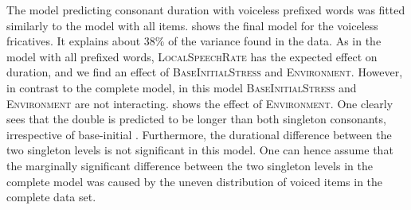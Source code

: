  
\begin{table}[b]
	\caption{Summary of linear model for variables predicting the Box-Cox-transformed duration of [s] in prefixed words with voiceless /s/\label{tbl: summary model6}}
\end{table}

The model predicting consonant duration with voiceless prefixed words was fitted similarly to the model with all items. 
 shows the final model for the voiceless fricatives. It explains about 38\% of the variance found in the data. 
As in the model with all prefixed words, \textsc{LocalSpeechRate} has the expected effect on duration, and we find an effect of \textsc{BaseInitialStress} and \textsc{Environment}. However, in contrast to the complete model, in this model \textsc{BaseInitialStress} and \textsc{Environment} are not interacting. 
 shows the effect of  \textsc{Environment}. One clearly sees that the double is predicted to be longer than both singleton consonants, irrespective of base-initial . Furthermore, the durational difference between the two singleton levels is not significant in this model. One can hence assume that the marginally significant difference between the two singleton levels in the complete model was caused by the uneven distribution of voiced items in the complete data set. 


